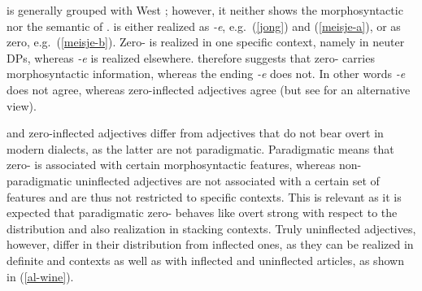 \documentclass[output=paper,colorlinks,citecolor=brown]{langscibook}
\begin{document}
 is generally grouped with West  \citep[15--17]{Harbert2007}; however, it neither shows the morphosyntactic nor the semantic  of .   is either realized as \textit{-e}, e.g.~(\ref{jong}) and (\ref{meisje-a}), or as zero, e.g.~(\ref{meisje-b}). Zero- is realized in one specific context, namely in neuter  DPs, whereas \textit{-e} is realized elsewhere. \citet{bennis2015demise} therefore suggests that zero- carries morphosyntactic information, whereas the ending \textit{-e} does not. In other words \textit{-e} does not agree, whereas zero-inflected adjectives agree (but see \citealp{roehrs2015inflections} for an alternative view).

\ea {} \label{jong}
\z
\z 

\ea {} \label{meisje}
\z
\z 

 and  zero-inflected adjectives differ from  adjectives that do not bear overt  in modern  dialects, as the latter are not paradigmatic. Paradigmatic means that zero- is associated with certain morphosyntactic features, whereas non-paradigmatic uninflected adjectives are not associated with a certain set of features and are thus not restricted to specific contexts. This is relevant as it is expected that paradigmatic zero- behaves like overt strong  with respect to the distribution and also realization in stacking contexts. Truly uninflected adjectives, however, differ in their distribution from inflected ones, as they can be realized in definite and  contexts as well as with inflected and uninflected articles, as shown in (\ref{al-wine}).
\newpage
\end{document}
